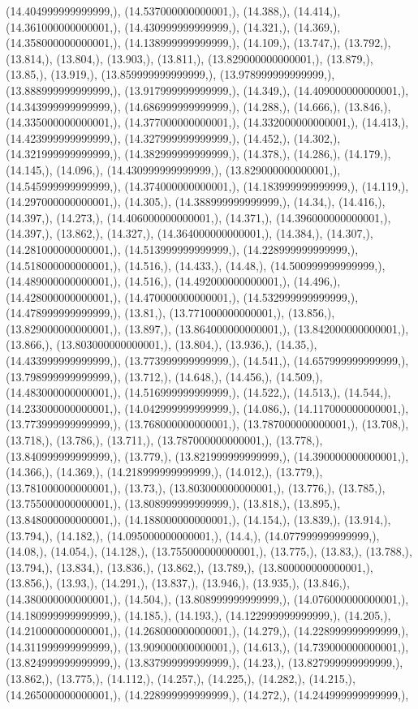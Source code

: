 \documentclass{article}
\begin{document}
(14.404999999999999,), (14.537000000000001,), (14.388,), (14.414,), (14.361000000000001,), (14.430999999999999,), (14.321,), (14.369,), (14.358000000000001,), (14.138999999999999,), (14.109,), (13.747,), (13.792,), (13.814,), (13.804,), (13.903,), (13.811,), (13.829000000000001,), (13.879,), (13.85,), (13.919,), (13.859999999999999,), (13.978999999999999,), (13.888999999999999,), (13.917999999999999,), (14.349,), (14.409000000000001,), (14.343999999999999,), (14.686999999999999,), (14.288,), (14.666,), (13.846,), (14.335000000000001,), (14.377000000000001,), (14.332000000000001,), (14.413,), (14.423999999999999,), (14.327999999999999,), (14.452,), (14.302,), (14.321999999999999,), (14.382999999999999,), (14.378,), (14.286,), (14.179,), (14.145,), (14.096,), (14.430999999999999,), (13.829000000000001,), (14.545999999999999,), (14.374000000000001,), (14.183999999999999,), (14.119,), (14.297000000000001,), (14.305,), (14.388999999999999,), (14.34,), (14.416,), (14.397,), (14.273,), (14.406000000000001,), (14.371,), (14.396000000000001,), (14.397,), (13.862,), (14.327,), (14.364000000000001,), (14.384,), (14.307,), (14.281000000000001,), (14.513999999999999,), (14.228999999999999,), (14.518000000000001,), (14.516,), (14.433,), (14.48,), (14.500999999999999,), (14.489000000000001,), (14.516,), (14.492000000000001,), (14.496,), (14.428000000000001,), (14.470000000000001,), (14.532999999999999,), (14.478999999999999,), (13.81,), (13.771000000000001,), (13.856,), (13.829000000000001,), (13.897,), (13.864000000000001,), (13.842000000000001,), (13.866,), (13.803000000000001,), (13.804,), (13.936,), (14.35,), (14.433999999999999,), (13.773999999999999,), (14.541,), (14.657999999999999,), (13.798999999999999,), (13.712,), (14.648,), (14.456,), (14.509,), (14.483000000000001,), (14.516999999999999,), (14.522,), (14.513,), (14.544,), (14.233000000000001,), (14.042999999999999,), (14.086,), (14.117000000000001,), (13.773999999999999,), (13.768000000000001,), (13.787000000000001,), (13.708,), (13.718,), (13.786,), (13.711,), (13.787000000000001,), (13.778,), (13.840999999999999,), (13.779,), (13.821999999999999,), (14.390000000000001,), (14.366,), (14.369,), (14.218999999999999,), (14.012,), (13.779,), (13.781000000000001,), (13.73,), (13.803000000000001,), (13.776,), (13.785,), (13.755000000000001,), (13.808999999999999,), (13.818,), (13.895,), (13.848000000000001,), (14.188000000000001,), (14.154,), (13.839,), (13.914,), (13.794,), (14.182,), (14.095000000000001,), (14.4,), (14.077999999999999,), (14.08,), (14.054,), (14.128,), (13.755000000000001,), (13.775,), (13.83,), (13.788,), (13.794,), (13.834,), (13.836,), (13.862,), (13.789,), (13.800000000000001,), (13.856,), (13.93,), (14.291,), (13.837,), (13.946,), (13.935,), (13.846,), (14.380000000000001,), (14.504,), (13.808999999999999,), (14.076000000000001,), (14.180999999999999,), (14.185,), (14.193,), (14.122999999999999,), (14.205,), (14.210000000000001,), (14.268000000000001,), (14.279,), (14.228999999999999,), (14.311999999999999,), (13.909000000000001,), (14.613,), (14.739000000000001,), (13.824999999999999,), (13.837999999999999,), (14.23,), (13.827999999999999,), (13.862,), (13.775,), (14.112,), (14.257,), (14.225,), (14.282,), (14.215,), (14.265000000000001,), (14.228999999999999,), (14.272,), (14.244999999999999,), 
\end{document}
